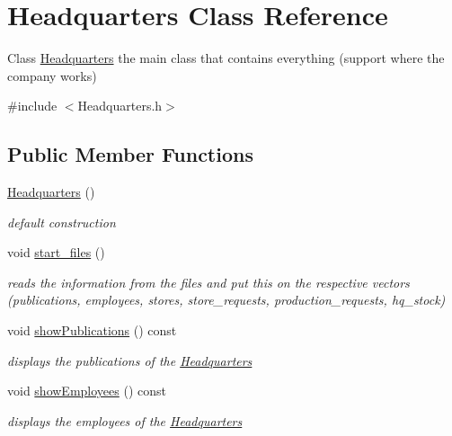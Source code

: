 \hypertarget{class_headquarters}{}\section{Headquarters Class Reference}
\label{class_headquarters}


Class \hyperlink{class_headquarters}{Headquarters} the main class that contains everything (support where the company works)  




{\ttfamily \#include $<$Headquarters.\+h$>$}

\subsection*{Public Member Functions}
\begin{DoxyCompactItemize}
\item 
\mbox{\label{class_headquarters_a47ada4046d4b5feaadc63d64439420ab}} 
\hyperlink{class_headquarters_a47ada4046d4b5feaadc63d64439420ab}{Headquarters} ()
\begin{DoxyCompactList}\small\item\em default construction \end{DoxyCompactList}\item 
void \hyperlink{class_headquarters_a55cc9c6aa484bb13d2612baa90098183}{start\+\_\+files} ()
\begin{DoxyCompactList}\small\item\em reads the information from the files and put this on the respective vectors (publications, employees, stores, store\+\_\+requests, production\+\_\+requests, hq\+\_\+stock) \end{DoxyCompactList}\item 
void \hyperlink{class_headquarters_aabdb893a0704f29221d48d6f1bb61bd6}{show\+Publications} () const
\begin{DoxyCompactList}\small\item\em displays the publications of the \hyperlink{class_headquarters}{Headquarters} \end{DoxyCompactList}\item 
void \hyperlink{class_headquarters_a3dacd649a7dce9de39328bf45fdd79d8}{show\+Employees} () const
\begin{DoxyCompactList}\small\item\em displays the employees of the \hyperlink{class_headquarters}{Headquarters} \end{DoxyCompactList}\item 

\end{DoxyCompactItemize}
